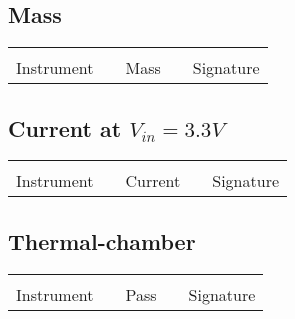 \subsection{Mass}
\vspace{25mm}
\begin{tabular}{@{}C{1.5in}p{1in}C{1.5in}p{1in}C{1.5in}@{}}
	\hrulefill & \hfill & \hrulefill & \hfill & \hrulefill\\
	Instrument & \hfill & Mass & \hfill & Signature \\
\end{tabular}

\subsection{Current at $V_{in}=3.3V$}
\vspace{25mm}
\begin{tabular}{@{}C{1.5in}p{1in}C{1.5in}p{1in}C{1.5in}@{}}
	\hrulefill & \hfill & \hrulefill & \hfill & \hrulefill\\
	Instrument & \hfill & Current & \hfill & Signature \\
\end{tabular}

\subsection{Thermal-chamber}
\vspace{25mm}
\begin{tabular}{@{}C{1.5in}p{1in}C{1.5in}p{1in}C{1.5in}@{}}
	\hrulefill & \hfill & \hrulefill & \hfill & \hrulefill\\
	Instrument & \hfill & Pass & \hfill & Signature \\
\end{tabular}


